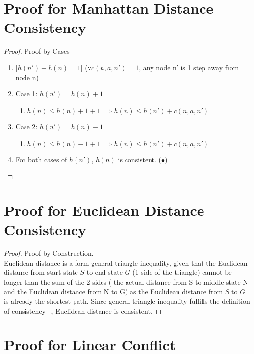 \documentclass[runningheads]{llncs}
\begin{document}
\appendix
\section{Proof for Manhattan Distance Consistency}
\label{appendix:manhat_cons}
\begin{proof} Proof by Cases
    \begin{enumerate}
        \item \( |h(n') - h(n) = 1| \) (\( \because c(n, a, n') = 1 \), any node n' is 1 step away from node n)
        \item Case 1: \( h(n') = h(n) + 1 \)
        \begin{enumerate}
            \item \( h(n) \leq h(n) + 1 + 1 \implies h(n) \leq h(n') + c(n, a, n') \)
        \end{enumerate}
        \item Case 2: \( h(n') = h(n) - 1 \)
        \begin{enumerate}
            \item \( h(n) \leq h(n) - 1 + 1 \implies h(n) \leq h(n') + c(n, a, n') \)
        \end{enumerate}
        \item For both cases of \( h(n') \), \( h(n) \) is consistent. (\(\bullet\))
    \end{enumerate}
\end{proof}

\section{Proof for Euclidean Distance Consistency}
\label{appendix:euc_cons}

\begin{proof} Proof by Construction. \\
    Euclidean distance is a form general triangle inequality, given that the Euclidean distance from start state \( S \) to end state \( G \) (1 side of the triangle) cannot be longer than the sum of the 2 sides ( the actual distance from S to middle state N and the Euclidean distance from N to G) as the Euclidean distance from \( S \) to \( G \) is already the shortest path. 
    Since general triangle inequality fulfills the definition of consistency ~\cite[p95]{stuart_russell_artifical_2010}, Euclidean distance is consistent.
\end{proof}

\section{Proof for Linear Conflict}
\label{appendix:linear_conflict}
\end{document}
